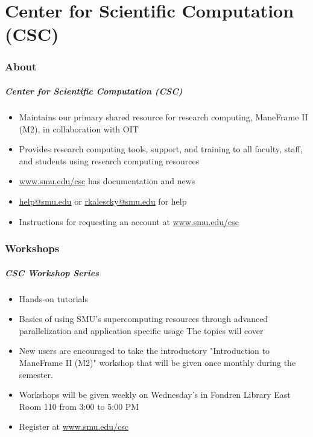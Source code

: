\part{Center for Scientific Computation (CSC)}

\section{About}

\begin{frame}
\frametitle{Center for Scientific Computation (CSC)}
\begin{itemize}
\item Maintains our primary shared resource for research computing, ManeFrame
      II (M2), in collaboration with OIT
\item Provides research computing tools, support, and training to all faculty,
      staff, and students using research computing resources
\item \href{https://www.smu.edu/csc}{www.smu.edu/csc} has documentation and
      news
\item \href{mailto:help@smu.edu}{help@smu.edu} or
      \href{mailto:rkalescky@smu.edu}{rkalescky@smu.edu} for help
\item Instructions for requesting an account at
      \href{https://www.smu.edu/csc}{www.smu.edu/csc}
\end{itemize}
\end{frame}

\section{Workshops}

\begin{frame}
\frametitle{CSC Workshop Series}
\begin{itemize}
\item Hands-on tutorials
\item Basics of using SMU's supercomputing resources through advanced
      parallelization and application specific usage The topics will cover
\item New users are encouraged to take the introductory "Introduction to
      ManeFrame II (M2)" workshop that will be given once monthly during the
      semester.
\item Workshops will be given weekly on Wednesday’s in Fondren Library East
      Room 110 from 3:00 to 5:00 PM
\item Register at
      \href{http://faculty.smu.edu/csc/documentation/workshops.html}%
      {www.smu.edu/csc}
\end{itemize}
\end{frame}

